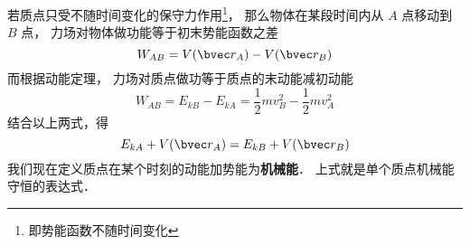 
若质点只受不随时间变化的保守力作用\footnote{即势能函数不随时间变化}， 那么物体在某段时间内从 $A$ 点移动到 $B$ 点， 力场对物体做功能等于初末势能函数之差
\begin{equation}
W_{AB} = V(\bvec r_A) - V(\bvec r_B)
\end{equation}
而根据动能定理， 力场对质点做功等于质点的末动能减初动能
\begin{equation}
W_{AB} = E_{kB} - E_{kA} = \frac12 m v_B^2 - \frac12 m v_A^2
\end{equation}
结合以上两式，得
\begin{equation}
E_{kA} + V(\bvec r_A) = E_{kB} + V(\bvec r_B)
\end{equation}
我们现在定义质点在某个时刻的动能加势能为\textbf{机械能}． 上式就是单个质点机械能守恒的表达式．

